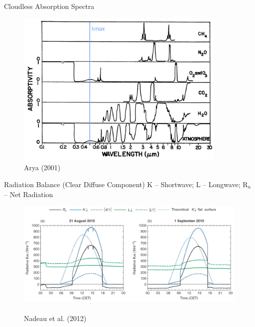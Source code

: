 
\begin{frame}{Cloudless Absorption Spectra}
\begin{figure}
	\includegraphics[width=0.9\textwidth]{fig27.png}
	\centering \tiny~\\Arya (2001)
\end{figure}
\end{frame}


\begin{frame}{Radiation Balance (Clear Diffuse Component)}
K – Shortwave; L – Longwave; $\text{R}_n$ – Net Radiation
\begin{figure}
	\includegraphics[width=\textwidth]{fig28.png}
	\centering \tiny~\\Nadeau et al. (2012)
\end{figure}
\end{frame}


